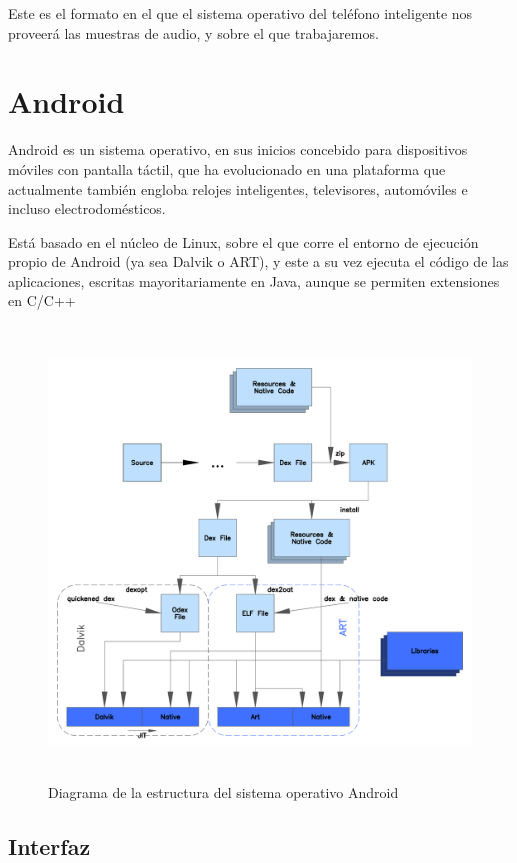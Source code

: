 Este es el formato en el que el sistema operativo del teléfono inteligente nos proveerá las muestras de audio, y sobre el que trabajaremos.

\section{Android}
\label{sec:AndroidIntro}

Android es un sistema operativo, en sus inicios concebido para dispositivos móviles con pantalla táctil, que ha evolucionado en una plataforma que actualmente también engloba relojes inteligentes, televisores, automóviles e incluso electrodomésticos.

Está basado en el núcleo de Linux, sobre el que corre el entorno de ejecución propio de Android (ya sea Dalvik o ART), y este a su vez ejecuta el código de las aplicaciones, escritas mayoritariamente en Java, aunque se permiten extensiones en C/C++

\begin{figure}[h] \centering
    \includegraphics[height=12cm]{graphs/ART_view.png} \caption{Diagrama de la estructura del sistema operativo Android}\label{fig:diagrama:ART}
\end{figure}

\subsection{Interfaz}

